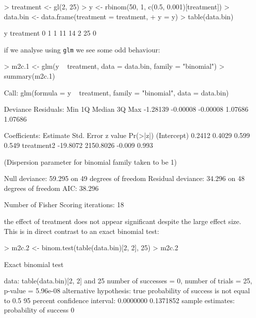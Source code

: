 \documentclass{article}
\begin{document}
\begin{Schunk}
\begin{Sinput}
> treatment <- gl(2, 25)
> y <- rbinom(50, 1, c(0.5, 0.001)[treatment])
> data.bin <- data.frame(treatment = treatment, 
+     y = y)
> table(data.bin)
\end{Sinput}
\begin{Soutput}
         y
treatment  0  1
        1 11 14
        2 25  0
\end{Soutput}
\end{Schunk}
 
if we analyse using \texttt{glm} we see some odd behaviour:

\begin{Schunk}
\begin{Sinput}
> m2c.1 <- glm(y ~ treatment, data = data.bin, family = "binomial")
> summary(m2c.1)
\end{Sinput}
\begin{Soutput}
Call:
glm(formula = y ~ treatment, family = "binomial", data = data.bin)

Deviance Residuals: 
     Min        1Q    Median        3Q       Max  
-1.28139  -0.00008  -0.00008   1.07686   1.07686  

Coefficients:
             Estimate Std. Error z value Pr(>|z|)
(Intercept)    0.2412     0.4029   0.599    0.549
treatment2   -19.8072  2150.8026  -0.009    0.993

(Dispersion parameter for binomial family taken to be 1)

    Null deviance: 59.295  on 49  degrees of freedom
Residual deviance: 34.296  on 48  degrees of freedom
AIC: 38.296

Number of Fisher Scoring iterations: 18
\end{Soutput}
\end{Schunk}

the effect of treatment does not appear significant despite the large effect size. This is in direct contrast to an exact binomial test: 

\begin{Schunk}
\begin{Sinput}
> m2c.2 <- binom.test(table(data.bin)[2, 2], 25)
> m2c.2
\end{Sinput}
\begin{Soutput}
	Exact binomial test

data:  table(data.bin)[2, 2] and 25 
number of successes = 0, number of trials = 25,
p-value = 5.96e-08
alternative hypothesis: true probability of success is not equal to 0.5 
95 percent confidence interval:
 0.0000000 0.1371852 
sample estimates:
probability of success 
                     0 
\end{Soutput}
\end{Schunk}
\end{document}
